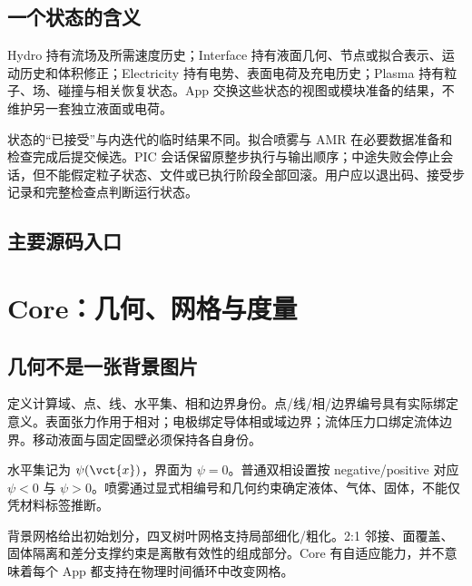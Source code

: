 \documentclass[a4paper,11pt]{article}
\begin{document}
\subsection{一个状态的含义}
Hydro 持有流场及所需速度历史；Interface 持有液面几何、节点或拟合表示、运动历史和体积修正；Electricity 持有电势、表面电荷及充电历史；Plasma 持有粒子、场、碰撞与相关恢复状态。App 交换这些状态的视图或模块准备的结果，不维护另一套独立液面或电荷。

状态的“已接受”与内迭代的临时结果不同。拟合喷雾与 AMR 在必要数据准备和检查完成后提交候选。PIC 会话保留原整步执行与输出顺序；中途失败会停止会话，但不能假定粒子状态、文件或已执行阶段全部回滚。用户应以退出码、接受步记录和完整检查点判断运行状态。

\subsection{主要源码入口}

\section{Core：几何、网格与度量}
\subsection{几何不是一张背景图片}
 定义计算域、点、线、水平集、相和边界身份。点/线/相/边界编号具有实际绑定意义。表面张力作用于相对；电极绑定导体相或域边界；流体压力口绑定流体边界。移动液面与固定固壁必须保持各自身份。

水平集记为 $\psi(\vct{x})$，界面为 $\psi=0$。普通双相设置按 negative/positive 对应 $\psi<0$ 与 $\psi>0$。喷雾通过显式相编号和几何约束确定液体、气体、固体，不能仅凭材料标签推断。

背景网格给出初始划分，四叉树叶网格支持局部细化/粗化。2:1 邻接、面覆盖、固体隔离和差分支撑约束是离散有效性的组成部分。Core 有自适应能力，并不意味着每个 App 都支持在物理时间循环中改变网格。
\end{document}
